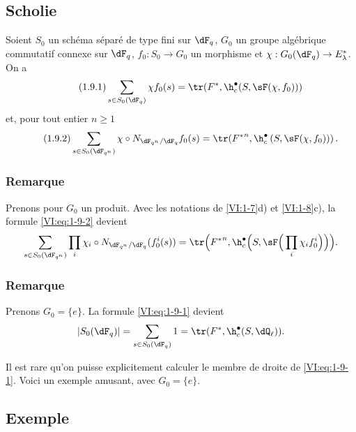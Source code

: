 \subsection{Scholie}\label{VI:1-9}
Soient $S_0$ un schéma séparé de type fini sur $\dF_q$, $G_0$ un groupe 
algébrique commutatif connexe sur $\dF_q$, $f_0:S_0\to G_0$ un morphisme et 
$\chi:G_0(\dF_q) \to E_\lambda^\ast$. On a 
\begin{equation*}\tag{1.9.1}\label{VI:eq:1-9-1}
  \sum_{s\in S_0(\dF_q)} \chi f_0(s) = \tr(F^\ast,\h_c^\bullet(S,\sF(\chi,f_0))) 
\end{equation*}
et, pour tout entier $n\geqslant 1$
\begin{equation*}\tag{1.9.2}\label{VI:eq:1-9-2}
  \sum_{s\in S_0(\dF_{q^n})} \chi\circ N_{\dF_{q^n}/\dF_q} f_0(s) = \tr({F^\ast}^n, \h_c^\bullet\left(S,\sF(\chi,f_0))\right) \text{.}
\end{equation*}





\addtocounter{subsubsection}{2}
\subsubsection{Remarque}\label{VI:1-9-3}

Prenons pour $G_0$ un produit. Avec les notations de \ref{VI:1-7}d) et 
\ref{VI:1-8}c), la formule \eqref{VI:eq:1-9-2} devient 
\[
  \sum_{s\in S_0(\dF_{q^n})} \prod_i \chi_i\circ N_{\dF_{q^n}/\dF_q} (f_0^i(s)) = \tr\Big({F^\ast}^n, \h_c^\bullet\Big(S,\sF\Big(\prod_i \chi_i f_0^i\Big)\Big)\Big) \text{.}
\]





\subsubsection{Remarque}\label{VI:1-9-4}

Prenons $G_0=\{e\}$. La formule \eqref{VI:eq:1-9-1} devient 
\[
  \left|S_0(\dF_q)\right| = \sum_{s\in S_0(\dF_q)} 1 = \tr(F^\ast,\h_c^\bullet(S,\dQ_\ell)) \text{.}
\]

Il est rare qu'on puisse explicitement calculer le membre de droite de 
\eqref{VI:eq:1-9-1}. Voici un exemple amusant, avec $G_0=\{e\}$. 






\subsection{Exemple}\label{VI:1-10}

